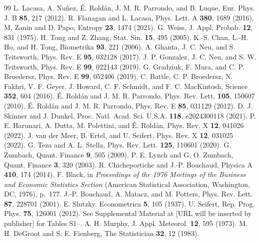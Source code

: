 \begin{thebibliography}{99}
 L. Lacasa, A. Nu\~nez, \'E. Rold\'an, J. M. R. Parrondo, and B. Luque, Eur. Phys. J. B \textbf{85}, 217 (2012).
 R. Flanagan and L. Lacasa, Phys. Lett. A \textbf{380}, 1689 (2016).
 M. Zanin and D. Papo, Entropy \textbf{23}, 1474 (2021).
 G. Weiss, J. Appl. Probab. \textbf{12}, 831 (1975).
 H. Tong and Z. Zhang, Stat. Sin. \textbf{15}, 495 (2005).
 K.-S. Chan, L.-H. Ho, and H. Tong, Biometrika \textbf{93}, 221 (2006).
 A. Ghanta, J. C. Neu, and S. Teitsworth, Phys. Rev. E \textbf{95}, 032128 (2017).
 J. P. Gonzalez, J. C. Neu, and S. W. Teitsworth, Phys. Rev. E \textbf{99}, 022143 (2019).
 G. Gradziuk, F. Mura, and C. P. Broedersz, Phys. Rev. E \textbf{99}, 052406 (2019).
 C. Battle, C. P. Broedersz, N. Fakhri, V. F. Geyer, J. Howard, C. F. Schmidt, and F. C. MacKintosh, Science \textbf{352}, 604 (2016).
 \'E. Rold\'an and J. M. R. Parrondo, Phys. Rev. Lett. \textbf{105}, 150607 (2010).
 \'E. Rold\'an and J. M. R. Parrondo, Phys. Rev. E \textbf{85}, 031129 (2012).
 D. J. Skinner and J. Dunkel, Proc. Natl. Acad. Sci. U.S.A. \textbf{118}, e2024300118 (2021).
 P. E. Harunari, A. Dutta, M. Polettini, and \'E. Rold\'an, Phys. Rev. X \textbf{12}, 041026 (2022).
 J. van der Meer, B. Ertel, and U. Seifert, Phys. Rev. X \textbf{12}, 031025 (2022).
 G. Teza and A. L. Stella, Phys. Rev. Lett. \textbf{125}, 110601 (2020).
 G. Zumbach, Quant. Finance \textbf{9}, 505 (2009).
 P. E. Lynch and G. O. Zumbach, Quant. Finance \textbf{3}, 320 (2003).
 R. Chicheportiche and J.-P. Bouchaud, Physica A \textbf{410}, 174 (2014).
 F. Black, in \textit{Proceedings of the 1976 Meetings of the Business and Economic Statistics Section} (American Statistical Association, Washington, DC, 1976), p.~177.
 J.-P. Bouchaud, A. Matacz, and M. Potters, Phys. Rev. Lett. \textbf{87}, 228701 (2001).
 E. Slutzky, Econometrica \textbf{5}, 105 (1937).
 U. Seifert, Rep. Prog. Phys. \textbf{75}, 126001 (2012).
 See Supplemental Material at [URL will be inserted by publisher] for Tables S1--.
 A. H. Murphy, J. Appl. Meteorol. \textbf{12}, 595 (1973).
 M. H. DeGroot and S. E. Fienberg, The Statistician \textbf{32}, 12 (1983).

\end{thebibliography}
